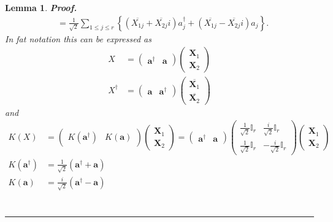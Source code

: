 \documentclass[aps, preprint]{revtex4}
\newtheorem{lemma}[theorem]{Lemma}
\newenvironment{proof}[1][Proof]{\noindent\textbf{#1.} }{\ \rule{0.5em}{0.5em}}
\begin{document}
\begin{lemma}
\begin{proof}
\begin{align}
 &  =\frac{1}{\sqrt{2}} \sum _{1 \leq j \leq r}\left \{\left (\overline{X_{1 j}} +\overline{X_{2 j}} i\right ) a_{j}^{ \dag } +\left (\overline{X_{1 j}} -\overline{X_{2 j}} i\right ) a_{j}\right \}\text{.}\end{align}In fat notation this can be expressed as
\begin{align}X &  =\left (\begin{array}{cc}\mathbf{a}^{ \dag } & \mathbf{a}\end{array}\right ) \left (\begin{array}{c}\mathbf{X}_{1} \\
\mathbf{X}_{2}\end{array}\right ) \\
X^{ \dag } &  =\left (\begin{array}{cc}\mathbf{a} & \mathbf{a}^{ \dag }\end{array}\right ) \left (\begin{array}{c}\overline{\mathbf{X}_{1}} \\
\overline{\mathbf{X}_{2}}\end{array}\right )\end{align}and
\begin{align}K \left (X\right ) &  =\left (\begin{array}{cc}K \left (\mathbf{a}^{ \dag }\right ) & K \left (\mathbf{a}\right )\end{array}\right ) \left (\begin{array}{c}\mathbf{X}_{1} \\
\mathbf{X}_{2}\end{array}\right ) =\left (\begin{array}{cc}\mathbf{a}^{ \dag } & \mathbf{a}\end{array}\right ) \left (\begin{array}{cc}\frac{1}{\sqrt{2}} \mathbb{I}_{r} & \frac{i}{\sqrt{2}} \mathbb{I}_{r} \\
\frac{1}{\sqrt{2}} \mathbb{I}_{r} &  -\frac{i}{\sqrt{2}} \mathbb{I}_{r}\end{array}\right ) \left (\begin{array}{c}\mathbf{X}_{1} \\
\mathbf{X}_{2}\end{array}\right ) \\
K \left (\mathbf{a}^{ \dag }\right ) &  =\frac{1}{\sqrt{2}} \left (\mathbf{a}^{ \dag } +\mathbf{a}\right ) \\
K \left (\mathbf{a}\right ) &  =\frac{i}{\sqrt{2}} \left (\mathbf{a}^{ \dag } -\mathbf{a}\right ) \\

\end{align}
\end{proof}
\end{lemma}
\end{document}
